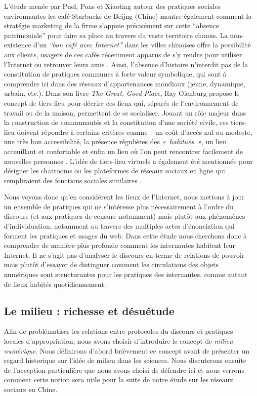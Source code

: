 L’étude menée par Puel, Pons et Xiaoting autour des pratiques sociales environnantes les café Starbucks de Beijng (Chine) montre également comment la stratégie marketing de la firme s’appuie précisément sur cette “absence patrimoniale” pour faire sa place au travers du vaste territoire chinois. La non-existence d’un \textit{“bon café avec Internet”} dans les villes chinoises offre la possibilité aux clients, usagers de ces cafés récemment apparus de s’y rendre pour utiliser l’Internet ou retrouver leurs amis \citep{Puel2007}. Ainsi, l’absence d’histoire n’interdit pas de la constitution de pratiques communes à forte valeur symbolique, qui sont à comprendre ici dans des réseaux d’appartenances mondiaux (jeune, dynamique, urbain, etc.). Dans son livre \textit{The Great, Good Place}, Ray Olenburg propose le concept de tiers-lieu pour décrire ces lieux qui, séparés de l’environnement de travail ou de la maison, permettent de se socialiser. Jouant un rôle majeur dans la construction de communautés et la constitution d’une société civile, ces tiers-lieu doivent répondre à certains critères comme : un coût d’accès nul ou modeste, une très bon accessibilité, la présence régulières des \textit{« habitués »}, un lieu acceuillant et confortable et enfin un lieu où l’on peut rencontrer facilement de nouvelles personnes \citep{Oldenburg1999}. L’idée de tiers-lieu virtuels a également été mentionnée pour désigner les chatrooms ou les plateformes de réseaux sociaux en ligne qui rempliraient des fonctions sociales similaires \citep{Soukup2006}. 

Nous voyons donc qu’en considérent les lieux de l’Internet, nous mettons à jour un ensemble de pratiques qui ne s’intéresse plus nécessairement à l’ordre du discours (et aux pratiques de censure notamment) mais plutôt aux phénomènes d’individuation, notamment au travers des multiples actes d’énonciation qui forment les pratiques et usages du web. Dans cette étude nous cherchons donc à comprendre de manière plus profonde comment les internautes habitent leur Internet. Il ne s’agit pas d’analyser le discours en terme de relations de pouvoir mais plutôt d’essayer de distinguer comment les circulations des objets numériques sont structurantes pour les pratiques des internautes, comme autant de lieux habités quotidiennement.

\subsection[Le milieu : richesse et désuétude ]{Le milieu : richesse et désuétude }
Afin de problématiser les relations entre protocoles du discours et pratiques locales d’appropriation, nous avons choisir d’introduire le concept de \textit{milieu numérique}. Nous définirons d’abord brièvement ce concept avant de présenter un regard historique sur l’idée de milieu dans les sciences. Nous discuterons ensuite de l’acception particulière que nous avons choisi de défendre ici et nous verrons comment cette notion sera utile pour la suite de notre étude sur les réseaux sociaux en Chine.

